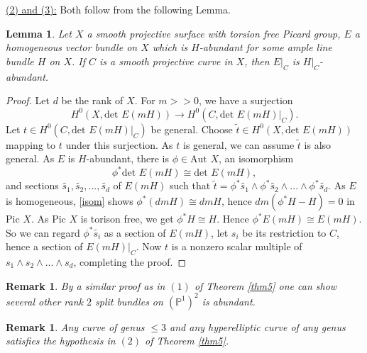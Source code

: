 \documentclass[11pt]{amsart}
\newtheorem{lem}[subsection]{Lemma}
\newtheorem{rem}[subsection]{Remark}
\theoremstyle{definition}
\begin{document}
\underline{(2) and (3):} Both follow from the following Lemma.
\begin{lem}\label{restriction}
    Let $X$ a smooth projective surface with torsion free Picard group,
    $E$ a homogeneous vector bundle on $X$ which is $H$-abundant for 
    some ample line bundle $H$ on $X$. If $C$ is a smooth projective
    curve in $X$, then $E|_C$ is $H|_C$-abundant.
\end{lem}
\begin{proof}
    Let $d$ be the rank of $X$. For $m>>0$, we have a surjection 
    $$H^0(X,\textrm{det }E(mH))\to H^0(C,\textrm{det }E(mH)|_C).$$ Let
    $t\in H^0(C,\textrm{det }E(mH)|_C)$ be general. Choose $\tilde{t}\in 
    H^0(X,\textrm{det }E(mH)) $ mapping to $t$ under this surjection. As
    $t$ is general, we can assume $\tilde{t}$ is also general. As $E$ is
    $H$-abundant, there is $\phi\in \textrm{Aut }X$, an isomorphism
    \begin{equation}\label{isom}
        \phi^*\textrm{det }E(mH)\cong \textrm{det }E(mH),
    \end{equation}
and sections $\tilde{s_1},\tilde{s_2},...,\tilde{s_d}$ of $E(mH)$ 
    such that $\tilde{t}=\phi^*\tilde{s_1}\wedge 
    \phi^*\tilde{s_2}\wedge...\wedge \phi^*\tilde{s_d}$. As $E$ is
    homogeneous, \eqref{isom} shows $\phi^*(dmH)\cong dmH$, hence
    $dm(\phi^*H-H)=0$ in $\textrm{Pic }X$. As $\textrm{Pic }X$ is
    torison free, we get $\phi^*H\cong H$. Hence $\phi^*E(mH)\cong 
    E(mH)$. So we can regard $\phi^*\tilde{s_i}$ as a section of $
    E(mH)$, let $s_i$ be its restriction to $C$, hence a section of
    $E(mH)|_C$. Now $t$ is a nonzero scalar multiple of $s_1\wedge 
    s_2\wedge ...\wedge s_d$, completing the proof.
\end{proof}
\begin{rem}
    By a similar proof as in $(1)$ of Theorem \ref{thm5} one can show 
    several other rank $2$ split bundles on $(\mathbb{P}^1)^2$ is
    abundant.
\end{rem}
\begin{rem}
    Any curve of genus $\leq 3$ and any hyperelliptic curve of any genus 
    satisfies the hypothesis in $(2)$ of Theorem \ref{thm5}.
\end{rem}
\printbibliography
\end{document}
